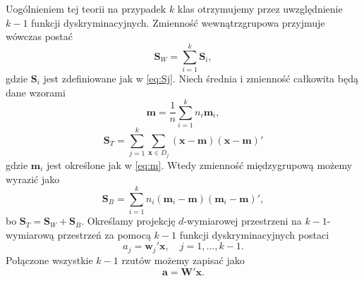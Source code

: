 \documentclass[
]{book}
\theoremstyle{plain}
\theoremstyle{definition}
\theoremstyle{definition}
\theoremstyle{definition}
\theoremstyle{definition}
\theoremstyle{definition}
\theoremstyle{remark}
\begin{document}
Uogólnieniem tej teorii na przypadek \(k\) klas otrzymujemy przez uwzględnienie \(k-1\) funkcji dyskryminacyjnych. Zmienność wewnątrzgrupowa przyjmuje wówczas postać
\begin{equation}
    \boldsymbol{S}_W=\sum_{i=1}^k\boldsymbol{S}_i,
\end{equation}
gdzie \(\boldsymbol{S}_i\) jest zdefiniowane jak w \eqref{eq:Sj}.
Niech średnia i zmienność całkowita będą dane wzorami
\begin{equation}
    \boldsymbol{m}=\frac{1}{n}\sum_{i=1}^kn_i\boldsymbol{m}_i,
\end{equation}
\begin{equation}
    \boldsymbol{S}_T=\sum_{j=1}^k\sum_{\boldsymbol{x}\in D_j}(\boldsymbol{x}-\boldsymbol{m})(\boldsymbol{x}-\boldsymbol{m})'
\end{equation}
gdzie \(\boldsymbol{m}_i\) jest określone jak w \eqref{eq:m}. Wtedy zmienność międzygrupową możemy wyrazić jako
\begin{equation}
    \boldsymbol{S}_B=\sum_{i=1}^kn_i(\boldsymbol{m}_i-\boldsymbol{m})(\boldsymbol{m}_i-\boldsymbol{m})',
\end{equation}
bo \(\boldsymbol{S}_T=\boldsymbol{S}_W+\boldsymbol{S}_B.\)
Określamy projekcję \(d\)-wymiarowej przestrzeni na \(k-1\)-wymiarową przestrzeń za pomocą \(k-1\) funkcji dyskryminacyjnych postaci
\begin{equation}
    a_j=\boldsymbol{w}_j'\boldsymbol{x}, \quad j=1,\ldots,k-1.
\end{equation}
Połączone wszystkie \(k-1\) rzutów możemy zapisać jako
\begin{equation}
    \boldsymbol{a}=\boldsymbol{W}'\boldsymbol{x}.
\end{equation}
\end{document}

